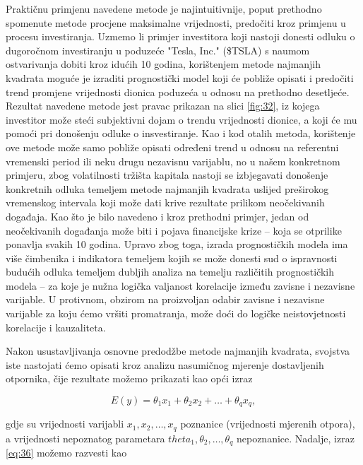 \documentclass[a4paper,12pt,oneside]{memoir}
\begin{document}
                Praktičnu primjenu navedene metode je najintuitivnije, poput prethodno spomenute metode procjene maksimalne vrijednosti, predočiti kroz primjenu u procesu investiranja. Uzmemo li primjer investitora koji nastoji donesti odluku o dugoročnom investiranju u poduzeće "Tesla, Inc." (\$TSLA) s naumom ostvarivanja dobiti kroz idućih 10 godina, korištenjem metode najmanjih kvadrata moguće je izraditi prognostički model koji će pobliže opisati i predočiti trend promjene vrijednosti dionica poduzeća u odnosu na prethodno desetljeće. Rezultat navedene metode jest pravac prikazan na slici \ref{fig:32}, iz kojega investitor može steći subjektivni dojam o trendu vrijednosti dionice, a koji će mu pomoći pri donošenju odluke o insvestiranje. Kao i kod otalih metoda, korištenje ove metode može samo pobliže opisati određeni trend u odnosu na referentni vremenski period ili neku drugu nezavisnu varijablu, no u našem konkretnom primjeru, zbog volatilnosti tržišta kapitala nastoji se izbjegavati donošenje konkretnih odluka temeljem metode najmanjih kvadrata uslijed preširokog vremenskog intervala koji može dati krive rezultate prilikom neočekivanih događaja. Kao što je bilo navedeno i kroz prethodni primjer, jedan od neočekivanih događanja može biti i pojava financijske krize -- koja se otprilike ponavlja svakih 10 godina. Upravo zbog toga, izrada prognostičkih modela ima više čimbenika i indikatora temeljem kojih se može donesti sud o ispravnosti budućih odluka temeljem dubljih analiza na temelju različitih prognostičkih modela -- za koje je nužna logička valjanost korelacije između zavisne i nezavisne varijable. U protivnom, obzirom na proizvoljan odabir zavisne i nezavisne varijable za koju ćemo vršiti promatranja, može doći do logičke neistovjetnosti korelacije i kauzaliteta.

                Nakon usustavljivanja osnovne predodžbe metode najmanjih kvadrata, svojstva iste nastojati ćemo opisati kroz analizu nasumičnog mjerenje dostavljenih otpornika, čije rezultate možemo prikazati kao opći izraz

                \begin{equation}
                    E(y)=\theta_1x_1+\theta_2x_2+\ldots+\theta_qx_q,
                    \label{eq:36}
                \end{equation}

                gdje su vrijednosti varijabli $x_1,x_2,\ldots,x_q$ poznanice (vrijednosti mjerenih otpora), a vrijednosti nepoznatog parametara $theta_1,\theta_2,\ldots,\theta_q$ nepoznanice. Nadalje, izraz \ref{eq:36} možemo razvesti kao
\end{document}
